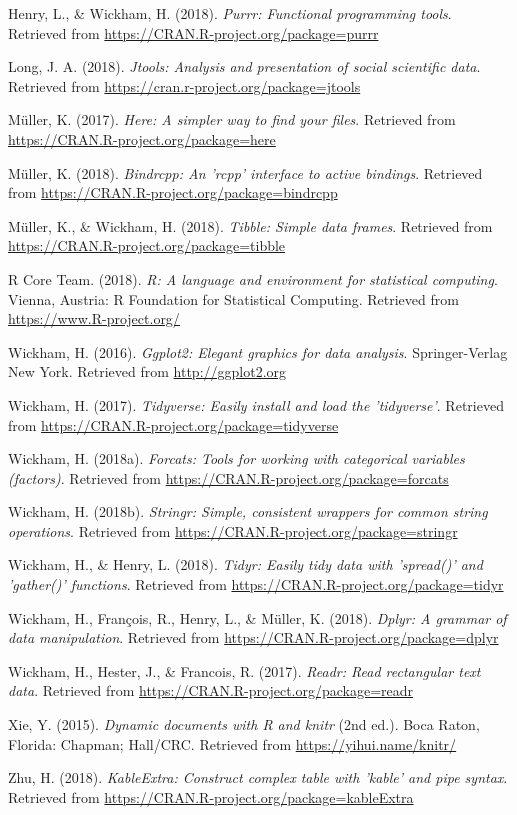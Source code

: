 \documentclass[man]{apa6}
\begin{document}
\hypertarget{ref-R-purrr}{}
Henry, L., \& Wickham, H. (2018). \emph{Purrr: Functional programming
tools}. Retrieved from \url{https://CRAN.R-project.org/package=purrr}

\hypertarget{ref-R-jtools}{}
Long, J. A. (2018). \emph{Jtools: Analysis and presentation of social
scientific data}. Retrieved from
\url{https://cran.r-project.org/package=jtools}

\hypertarget{ref-R-here}{}
Müller, K. (2017). \emph{Here: A simpler way to find your files}.
Retrieved from \url{https://CRAN.R-project.org/package=here}

\hypertarget{ref-R-bindrcpp}{}
Müller, K. (2018). \emph{Bindrcpp: An 'rcpp' interface to active
bindings}. Retrieved from
\url{https://CRAN.R-project.org/package=bindrcpp}

\hypertarget{ref-R-tibble}{}
Müller, K., \& Wickham, H. (2018). \emph{Tibble: Simple data frames}.
Retrieved from \url{https://CRAN.R-project.org/package=tibble}

\hypertarget{ref-R-base}{}
R Core Team. (2018). \emph{R: A language and environment for statistical
computing}. Vienna, Austria: R Foundation for Statistical Computing.
Retrieved from \url{https://www.R-project.org/}

\hypertarget{ref-R-ggplot2}{}
Wickham, H. (2016). \emph{Ggplot2: Elegant graphics for data analysis}.
Springer-Verlag New York. Retrieved from \url{http://ggplot2.org}

\hypertarget{ref-R-tidyverse}{}
Wickham, H. (2017). \emph{Tidyverse: Easily install and load the
'tidyverse'}. Retrieved from
\url{https://CRAN.R-project.org/package=tidyverse}

\hypertarget{ref-R-forcats}{}
Wickham, H. (2018a). \emph{Forcats: Tools for working with categorical
variables (factors)}. Retrieved from
\url{https://CRAN.R-project.org/package=forcats}

\hypertarget{ref-R-stringr}{}
Wickham, H. (2018b). \emph{Stringr: Simple, consistent wrappers for
common string operations}. Retrieved from
\url{https://CRAN.R-project.org/package=stringr}

\hypertarget{ref-R-tidyr}{}
Wickham, H., \& Henry, L. (2018). \emph{Tidyr: Easily tidy data with
'spread()' and 'gather()' functions}. Retrieved from
\url{https://CRAN.R-project.org/package=tidyr}

\hypertarget{ref-R-dplyr}{}
Wickham, H., François, R., Henry, L., \& Müller, K. (2018). \emph{Dplyr:
A grammar of data manipulation}. Retrieved from
\url{https://CRAN.R-project.org/package=dplyr}

\hypertarget{ref-R-readr}{}
Wickham, H., Hester, J., \& Francois, R. (2017). \emph{Readr: Read
rectangular text data}. Retrieved from
\url{https://CRAN.R-project.org/package=readr}

\hypertarget{ref-R-knitr}{}
Xie, Y. (2015). \emph{Dynamic documents with R and knitr} (2nd ed.).
Boca Raton, Florida: Chapman; Hall/CRC. Retrieved from
\url{https://yihui.name/knitr/}

\hypertarget{ref-R-kableExtra}{}
Zhu, H. (2018). \emph{KableExtra: Construct complex table with 'kable'
and pipe syntax}. Retrieved from
\url{https://CRAN.R-project.org/package=kableExtra}

\endgroup
\end{document}
